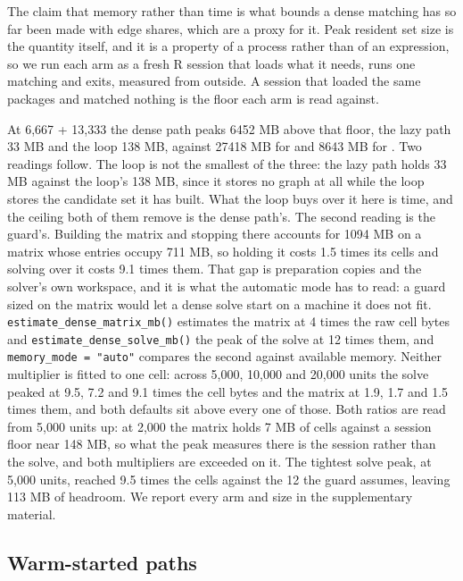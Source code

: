 \FloatBarrier

The claim that memory rather than time is what bounds a dense matching has so
far been made with edge shares, which are a proxy for it. Peak resident set size
is the quantity itself, and it is a property of a process rather than of an
expression, so we run each arm as a fresh R session that loads what it needs, runs
one matching and exits, measured from outside. A session that loaded the same
packages and matched nothing is the floor each arm is read against.

At 6,667 + 13,333 the dense path peaks 6452 MB
above that floor, the lazy path 33 MB and the
loop 138 MB, against
27418 MB for  and
8643 MB for . Two readings follow. The loop is not the smallest of the three: the lazy path
holds 33 MB against the loop's 138 MB, since it stores no graph at all
while the loop stores the candidate set it has built. What the loop buys over
it here is time, and the ceiling both of them remove is the dense path's. The
second reading is the guard's. Building the matrix and stopping there accounts
for 1094 MB on a matrix whose entries
occupy 711 MB, so holding it costs 1.5 times its cells and solving over it costs 9.1 times them. That gap is preparation copies
and the solver's own workspace, and it is what the automatic mode has to read:
a guard sized on the matrix would let a dense solve start on a machine it does
not fit. \texttt{estimate\_dense\_matrix\_mb()} estimates the matrix at
4 times the raw cell bytes and \texttt{estimate\_dense\_solve\_mb()} the
peak of the solve at 12 times them, and \texttt{memory\_mode\ =\ "auto"}
compares the second against available memory. Neither multiplier is fitted to one cell: across 5,000, 10,000 and 20,000 units the
solve peaked at 9.5, 7.2 and 9.1 times the cell bytes and the matrix at
1.9, 1.7 and 1.5 times them, and both defaults sit above every one of those. Both ratios are read from 5,000
units up: at 2,000 the matrix holds
7 MB of cells
against a session floor near
148 MB, so what
the peak measures there is the session rather than the solve, and both multipliers are exceeded on it. The tightest solve peak, at
5,000 units, reached 9.5 times the cells
against the 12 the guard assumes, leaving
113 MB of headroom.
We report every arm and size in the supplementary material.

\FloatBarrier

\subsection{Warm-started paths}\label{warm-started-paths}


